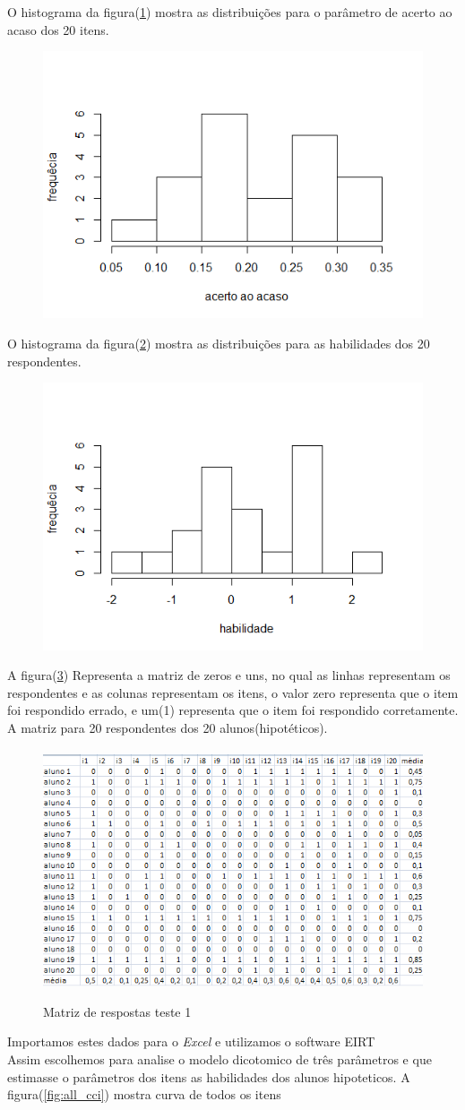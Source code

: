 	O histograma da figura(\ref{fig:c})  mostra as distribuições para o parâmetro de acerto ao acaso dos 20 itens.
	\begin{figure}[!h]
		\centering
		\includegraphics[width=0.6\linewidth]{img/c}
		\caption{}
		\label{fig:c}
	\end{figure}
	\newpage
	O histograma da figura(\ref{fig:hab}) mostra as distribuições para as habilidades dos 20 respondentes.
	\begin{figure} [!h]
		\centering
		\includegraphics[width=0.6\linewidth]{img/hab}
		\caption{}
		\label{fig:hab}
	\end{figure}
	    A figura(\ref{fig:zeros}) Representa a matriz de zeros e uns, no qual as linhas representam os respondentes e as colunas representam os itens, o valor zero representa que o item foi respondido errado, e um(1) representa que o item foi respondido corretamente. A matriz para 20 respondentes dos 20 alunos(hipotéticos).
    \paragraph{}
		\begin{figure}[!h]
		\caption{Matriz de respostas teste 1}
		\centering
		\includegraphics[width=0.6\linewidth]{img/zeros}
		\label{fig:zeros}
	\end{figure}
    Importamos estes dados para o \textit{Excel} e utilizamos o software EIRT\\
 Assim escolhemos para analise o modelo dicotomico de três parâmetros e que estimasse o parâmetros dos itens as habilidades dos alunos hipoteticos.
	A figura(\ref{fig:all_cci}) mostra curva de todos os itens\\
